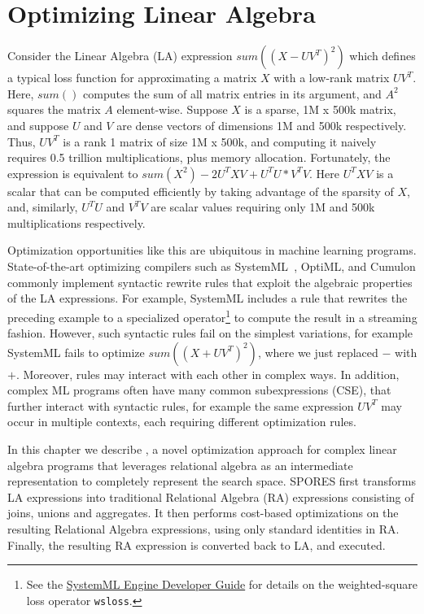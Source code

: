 \chapter{Optimizing Linear Algebra}
\label{chapter:spores}


Consider the Linear Algebra (LA) expression $sum((X-UV^T)^2)$ which
defines a typical loss function for approximating a matrix $X$ with a
low-rank matrix $UV^T$. Here, $sum()$ computes the sum of all matrix
entries in its argument, and $A^2$ squares the matrix $A$
element-wise. Suppose $X$ is a sparse, 1M x 500k matrix, and suppose
$U$ and $V$ are dense vectors of dimensions 1M and 500k respectively.
Thus, $UV^T$ is a rank 1 matrix of size 1M x 500k, and computing it
naively requires 0.5 trillion multiplications, plus memory allocation.
Fortunately, the expression is equivalent to
$sum(X^2) - 2U^TXV + U^TU * V^TV$.  Here $U^TXV$ is a scalar that can
be computed efficiently by taking advantage of the sparsity of $X$,
and, similarly, $U^TU$ and $V^TV$ are scalar values requiring only 1M
and 500k multiplications respectively.

Optimization opportunities like this are ubiquitous in machine
learning programs. State-of-the-art optimizing compilers such as
SystemML~\cite{DBLP:reference/bdt/Boehm19},
OptiML\cite{DBLP:conf/icml/SujeethLBRCWAOO11}, and
Cumulon\cite{DBLP:conf/sigmod/HuangB013} commonly implement syntactic
rewrite rules that exploit the algebraic properties of the LA
expressions. For example, SystemML includes a rule that rewrites the
preceding example to a specialized operator\footnote{See the
  \href{https://systemml.apache.org/docs/0.12.0/engine-dev-guide.html}{SystemML
    Engine Developer Guide} for details on the weighted-square loss
  operator \texttt{wsloss}. } to compute the result in a streaming
fashion.  However, such syntactic rules fail on the simplest
variations, for example SystemML fails to optimize $sum((X+UV^T)^2)$,
where we just replaced $-$ with $+$.  Moreover, rules may interact
with each other in complex ways.  In addition, complex ML programs
often have many common subexpressions (CSE), that further interact
with syntactic rules, for example the same expression $UV^T$ may occur
in multiple contexts, each requiring different optimization rules.

In this chapter we describe \sys, a novel optimization approach for
complex linear algebra programs that leverages relational algebra as
an intermediate representation to completely represent the search
space. SPORES first transforms LA expressions into traditional
Relational Algebra (RA) expressions consisting of joins, unions 
and aggregates.  It then performs cost-based optimizations on
the resulting Relational Algebra expressions, using only standard
identities in RA.  Finally, the resulting RA expression is converted
back to LA, and executed.

